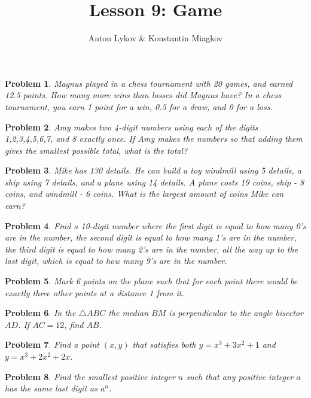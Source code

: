 \documentclass[a4paper,12pt]{article}
\author{Anton Lykov \& Konstantin Miagkov}
\title{Lesson 9: Game}
\theoremstyle{perfect}
\newtheorem{prb}{Problem}
\begin{document}
 
\setlength{\parindent}{0cm}
\maketitle

\begin{prb}
Magnus played in a chess tournament with 20 games, and earned 12.5 points.
How many more wins than losses did Magnus have? In a chess tournament, you earn 1 point for a win, 0.5 for a draw, and 0 for a loss. 
\end{prb} 

\begin{prb}
Amy makes two 4-digit numbers using each of the digits 1,2,3,4,5,6,7, and 8 exactly once. If Amy makes the numbers so that adding them gives the smallest possible total, what is the total?
\end{prb} 

\begin{prb}
	Mike has 130 details. He can build a toy windmill using 5 details, a ship using 7 details, and a plane using 14 details. A plane costs 19 coins, ship - 8 coins, and windmill - 6 coins. What is the largest amount of coins Mike can earn?
\end{prb} 

\begin{prb}
Find a 10-digit number where the first digit is equal to how many 0's are in the number, the second digit is equal to how many 1's are in the number, the third digit is equal to how many 2's are in the number, all the way up to the last digit, which is equal to how many 9's are in the number.
\end{prb}
 
\begin{prb}
Mark 6 points on the plane such that for each point there would be exactly three other points at a distance 1 from it.
\end{prb}

\begin{prb}
In the $\triangle ABC$ the median $BM$ is perpendicular to the angle bisector $AD$. If $AC = 12$, find $AB$.
\end{prb}

\begin{prb}
Find a point $(x,y)$ that satisfies both $y = x^3 + 3x^2 + 1$ and $y = x^3 + 2x^2 + 2x$.
\end{prb}

\begin{prb}
Find the smallest positive integer $n$ such that any positive integer $a$ has the same last digit as $a^n$.
\end{prb}
\end{document}
